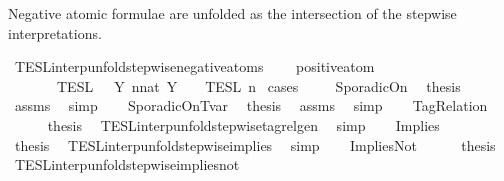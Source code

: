 \begin{isabellebody}
\begin{isamarkuptext}
Negative atomic formulae are unfolded
  as the intersection of the stepwise interpretations.%
\end{isamarkuptext}\isamarkuptrue%
\isamarkupfalse%
\ TESL{\isacharunderscore}interp{\isacharunderscore}unfold{\isacharunderscore}stepwise{\isacharunderscore}negative{\isacharunderscore}atoms{\isacharcolon}\isanewline
\ \ \ {\isacartoucheopen}{\isasymnot}\ positive{\isacharunderscore}atom\ {\isasymphi}{\isacartoucheclose}\isanewline
\ \ \ \ \ {\isacartoucheopen}{\isasymlbrakk}\ {\isasymphi}\ {\isasymrbrakk}\isactrlsub T\isactrlsub E\isactrlsub S\isactrlsub L\ {\isacharequal}\ {\isasymInter}\ {\isacharbraceleft}Y{\isachardot}\ {\isasymexists}n{\isacharcolon}{\isacharcolon}nat{\isachardot}\ Y\ {\isacharequal}\ {\isasymlbrakk}\ {\isasymphi}\ {\isasymrbrakk}\isactrlsub T\isactrlsub E\isactrlsub S\isactrlsub L\isactrlbsup {\isasymge}\ n\isactrlesup {\isacharbraceright}{\isacartoucheclose}\isanewline
%
\isadelimproof
%
\endisadelimproof
%
\isatagproof
{}\isamarkupfalse%
\ {\isacharparenleft}cases\ {\isasymphi}{\isacharparenright}\isanewline
\ \ \isamarkupfalse%
\ SporadicOn\ \isamarkupfalse%
\ {\isacharquery}thesis\ \isamarkupfalse%
\ assms\ \isamarkupfalse%
\ simp\isanewline
{}\isamarkupfalse%
\isanewline
\ \ \isamarkupfalse%
\ SporadicOnTvar\ \isamarkupfalse%
\ {\isacharquery}thesis\ \isamarkupfalse%
\ assms\ \isamarkupfalse%
\ simp\isanewline
{}\isamarkupfalse%
\isanewline
\ \ \isamarkupfalse%
\ TagRelation\isanewline
\ \ \ \ \isamarkupfalse%
\ {\isacharquery}thesis\ \isamarkupfalse%
\ TESL{\isacharunderscore}interp{\isacharunderscore}unfold{\isacharunderscore}stepwise{\isacharunderscore}tagrelgen\ \isamarkupfalse%
\ simp\isanewline
{}\isamarkupfalse%
\isanewline
\ \ \isamarkupfalse%
\ Implies\isanewline
\ \ \ \ \isamarkupfalse%
\ {\isacharquery}thesis\ \isamarkupfalse%
\ TESL{\isacharunderscore}interp{\isacharunderscore}unfold{\isacharunderscore}stepwise{\isacharunderscore}implies\ \isamarkupfalse%
\ simp\isanewline
{}\isamarkupfalse%
\isanewline
\ \ \isamarkupfalse%
\ ImpliesNot\isanewline
\ \ \ \ \isamarkupfalse%
\ {\isacharquery}thesis\ \isamarkupfalse%
\ TESL{\isacharunderscore}interp{\isacharunderscore}unfold{\isacharunderscore}stepwise{\isacharunderscore}implies{\isacharunderscore}not\ \isamarkupfalse%

\end{isabellebody}
